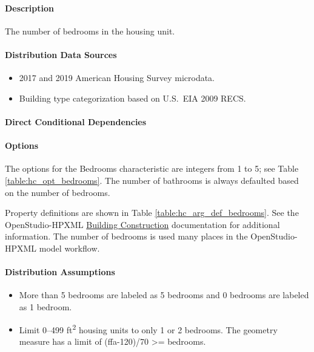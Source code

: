 \paragraph{Description}
% 
The number of bedrooms in the housing unit.

\paragraph{Distribution Data Sources}
% 
\begin{itemize}
    \item 2017 and 2019 American Housing Survey microdata.
    \item Building type categorization based on U.S.~EIA 2009 RECS.
\end{itemize}

\paragraph{Direct Conditional Dependencies}


\paragraph{Options}
The options for the Bedrooms characteristic are integers from 1 to 5; see Table \ref{table:hc_opt_bedrooms}. The number of bathrooms is always defaulted based on the number of bedrooms.



Property definitions are shown in Table \ref{table:hc_arg_def_bedrooms}. See the OpenStudio-HPXML \href{https://openstudio-hpxml.readthedocs.io/en/v1.10.0/workflow_inputs.html#hpxml-building-construction}{Building Construction} documentation for additional information. The number of bedrooms is used many places in the OpenStudio-HPXML model workflow.



\paragraph{Distribution Assumptions}
% 
\begin{itemize}
    \item More than 5 bedrooms are labeled as 5 bedrooms and 0 bedrooms are labeled as 1 bedroom.
    \item Limit 0--499 ft\textsuperscript{2} housing units to only 1 or 2 bedrooms. The geometry measure has a limit of (ffa-120)/70 >= bedrooms.
\end{itemize}
